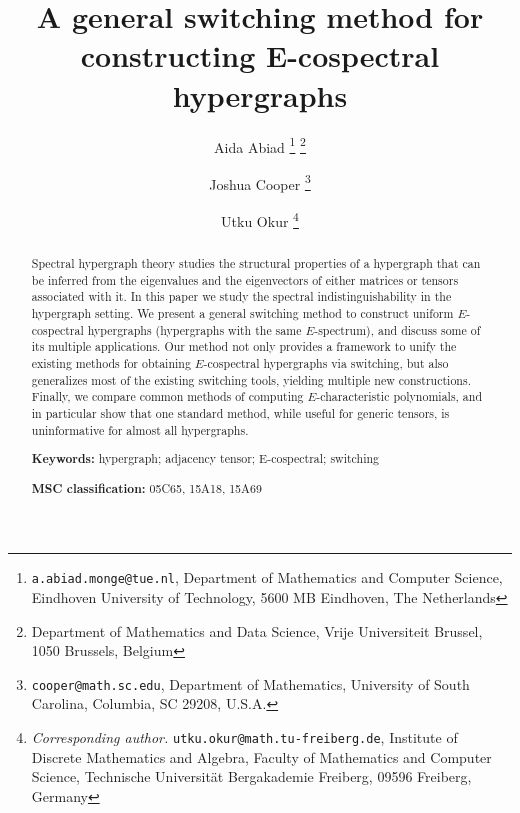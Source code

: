 \documentclass[12pt]{article}
\numberwithin{equation}{section}
\theoremstyle{definition}
\begin{document}
\title{A general switching method for constructing E-cospectral hypergraphs}

\author{
Aida Abiad
\thanks{\texttt{a.abiad.monge@tue.nl}, Department of Mathematics and Computer Science, Eindhoven University of Technology, 5600 MB Eindhoven, The Netherlands}
\thanks{Department of Mathematics and Data Science, Vrije Universiteit Brussel, 1050 Brussels, Belgium} 
\and
Joshua Cooper \thanks{\texttt{cooper@math.sc.edu}, Department of Mathematics, University of South Carolina, Columbia, SC 29208, U.S.A.} 
\and
Utku Okur
\thanks{\textit{Corresponding author.} \texttt{utku.okur@math.tu-freiberg.de}, Institute of Discrete Mathematics and Algebra, Faculty of Mathematics and Computer Science, Technische Universit\"at Bergakademie Freiberg, 09596 Freiberg, Germany}
}

\date{}
\maketitle

\begin{abstract}
Spectral hypergraph theory studies the structural properties of a hypergraph that can be inferred from the eigenvalues and the eigenvectors of either matrices or tensors associated with it. In this paper we study the spectral indistinguishability in the hypergraph setting.  We present a general switching method to construct uniform $E$-cospectral hypergraphs (hypergraphs with the same $E$-spectrum), and discuss some of its multiple applications. Our method not only provides a framework to unify the existing methods for obtaining $E$-cospectral hypergraphs via switching, but also generalizes most of the existing switching tools, yielding multiple new constructions. Finally, we compare common methods of computing $E$-characteristic polynomials, and in particular show that one standard method, while useful for generic tensors, is uninformative for almost all hypergraphs.

\medskip

\noindent \textbf{Keywords:} hypergraph; adjacency tensor; E-cospectral; switching 

\noindent \textbf{MSC classification:} 05C65, 15A18, 15A69
\end{abstract}

\end{document}
